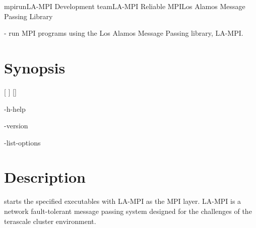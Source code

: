 \documentclass[english]{article}
\begin{document}
\begin{Name}{1}{mpirun}{LA-MPI Development team}{LA-MPI Reliable MPI}{Los Alamos Message Passing Library}

   - run MPI programs using the Los Alamos Message Passing library, LA-MPI.  
\end{Name}

\section{Synopsis}

 [\Bar{} ]   
      
 []

 -h\Bar-help

 -version

 -list-options

\section{Description}
 starts the specified executables with LA-MPI as the MPI layer. LA-MPI is a network fault-tolerant message passing 
system designed for the challenges of the terascale cluster environment.
\end{document}
